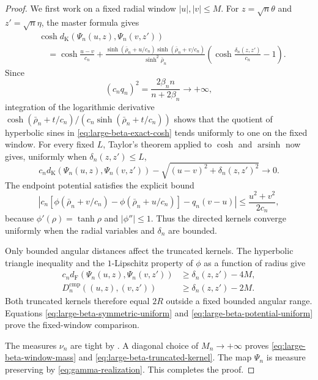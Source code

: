\documentclass[10pt,a4paper]{amsart}
\numberwithin{equation}{section}
\DeclareMathOperator{\arsinh}{arsinh}
\newcommand{\dF}{d_{\mathrm F}}
\newcommand{\dK}{d_{\mathrm K}}
\begin{document}
\begin{proof}
We first work on a fixed radial window $|u|,|v|\le M$.  For $z=\sqrt n\theta$ and $z'=\sqrt n\eta$, the master formula gives
\begin{equation}\label{eq:large-beta-exact-cosh}
 \begin{split}
 &\cosh\dK(\Psi_n(u,z),\Psi_n(v,z'))\\
 &\quad=\cosh\frac{u-v}{c_n}
 +\frac{\sinh(\bar\rho_n+u/c_n)
 \sinh(\bar\rho_n+v/c_n)}{\sinh^2\bar\rho_n}
 \left(\cosh\frac{\delta_n(z,z')}{c_n}-1\right).
 \end{split}
\end{equation}
Since
\[ (c_nq_n)^2=\frac{2\beta_n n}{n+2\beta_n}\longrightarrow+\infty, \]
integration of the logarithmic derivative
$\cosh(\bar\rho_n+t/c_n)/(c_n\sinh(\bar\rho_n+t/c_n))$ shows that the quotient of hyperbolic sines in \eqref{eq:large-beta-exact-cosh} tends uniformly to one on the fixed window.  For every fixed $L$, Taylor's theorem applied to $\cosh$ and $\arsinh$ now gives, uniformly when $\delta_n(z,z')\le L$,
\begin{equation}\label{eq:large-beta-symmetric-uniform} c_n\dK(\Psi_n(u,z),\Psi_n(v,z')) -\sqrt{(u-v)^2+\delta_n(z,z')^2} \longrightarrow0. \end{equation}
The endpoint potential satisfies the explicit bound
\begin{equation}\label{eq:large-beta-potential-uniform} \left|c_n\left[ \phi(\bar\rho_n+v/c_n)-\phi(\bar\rho_n+u/c_n) \right]-q_n(v-u)\right| \le\frac{u^2+v^2}{2c_n}, \end{equation}
because $\phi'(\rho)=\tanh\rho$ and $|\phi''|\le1$.  Thus the directed kernels converge uniformly when the radial variables and $\delta_n$ are bounded.

Only bounded angular distances affect the truncated kernels.  The hyperbolic triangle inequality and the $1$-Lipschitz property of $\phi$ as a function of radius give
\begin{align*}
c_n\dF(\Psi_n(u,z),\Psi_n(v,z')) &\ge\delta_n(z,z')-4M,\\
D_n^{\mathrm{cmp}}((u,z),(v,z')) &\ge\delta_n(z,z')-2M.
\end{align*}
Both truncated kernels therefore equal $2R$ outside a fixed bounded angular range.  Equations \eqref{eq:large-beta-symmetric-uniform} and \eqref{eq:large-beta-potential-uniform} prove the fixed-window comparison.

The measures $\nu_n$ are tight by .  A diagonal choice of $M_n\to+\infty$ proves \eqref{eq:large-beta-window-mass} and \eqref{eq:large-beta-truncated-kernel}.  The map $\Psi_n$ is measure preserving by \eqref{eq:gamma-realization}.  This completes the proof.
\end{proof}
\end{document}
